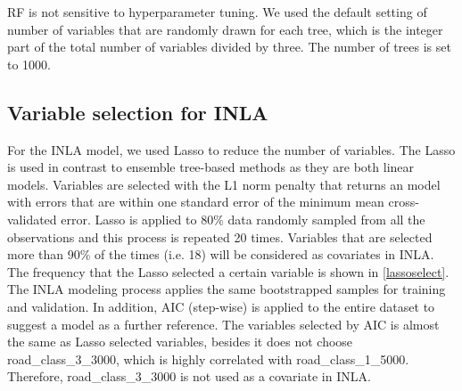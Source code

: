 \documentclass{article}
\begin{document}
RF is not sensitive to hyperparameter tuning. We used the default setting of number of variables that are randomly drawn for each tree\citep{breiman2001random}, which is the integer part of the total number of variables divided by three. The number of trees is set to 1000. 


\subsection{Variable selection for INLA} 

For the INLA model, we used Lasso to reduce the number of variables. The Lasso is used in contrast to ensemble tree-based methods as they are both linear models. Variables are selected with the L1 norm penalty that returns an model with errors that are within one standard error of the minimum mean cross-validated error. Lasso is applied to 80\% data randomly sampled from all the observations and this process is repeated  20 times. Variables that are selected more than 90\% of the times (i.e. 18) will be considered as covariates in INLA. The frequency that the Lasso selected a certain variable is shown in \cref{lassoselect}. The INLA modeling process applies the same bootstrapped samples for training and validation.  In addition, AIC (step-wise) is applied to the entire dataset to suggest a model as a further reference. The variables selected by AIC is almost the same as Lasso selected variables, besides it does not choose road\_class\_3\_3000, which is highly correlated with  road\_class\_1\_5000. Therefore,  road\_class\_3\_3000 is not used as a covariate in INLA.  
\end{document}
